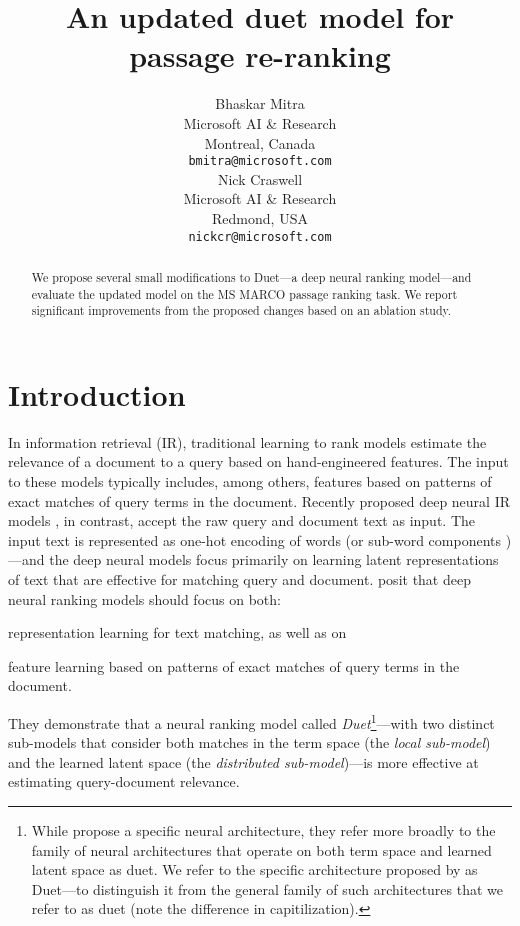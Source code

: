 \documentclass{article}
\title{An updated duet model for passage re-ranking}
\author{
  Bhaskar Mitra \\
  Microsoft AI \& Research \\
  Montreal, Canada \\
  \texttt{bmitra@microsoft.com} \\
   \And
 Nick Craswell \\
  Microsoft AI \& Research \\
  Redmond, USA \\
  \texttt{nickcr@microsoft.com} \\
}
\begin{document}
\maketitle

\begin{abstract}
We propose several small modifications to Duet---a deep neural ranking model---and evaluate the updated model on the MS MARCO passage ranking task. We report significant improvements from the proposed changes based on an ablation study.
\end{abstract}



\section{Introduction}
\label{sec:intro}
In information retrieval (IR), traditional learning to rank \citep{Liu:2009} models estimate the relevance of a document to a query based on hand-engineered features.
The input to these models typically includes, among others, features based on patterns of exact matches of query terms in the document.
Recently proposed deep neural IR models \citep{mitra2018introduction}, in contrast, accept the raw query and document text as input.
The input text is represented as one-hot encoding of words (or sub-word components \citep{kim2016character, jozefowicz2016exploring, sennrich2015neural})---and the deep neural models focus primarily on learning latent representations of text that are effective for matching query and document.
\citet{mitra2016learning} posit that deep neural ranking models should focus on both:
\begin{enumerate*}[label=(\roman*)]
    \item representation learning for text matching, as well as on
    \item feature learning based on patterns of exact matches of query terms in the document.
\end{enumerate*}
They demonstrate that a neural ranking model called \emph{Duet}\footnote{
While \citet{mitra2016learning} propose a specific neural architecture, they refer more broadly to the family of neural architectures that operate on both term space and learned latent space as duet.
We refer to the specific architecture proposed by \citet{mitra2016learning} as Duet---to distinguish it from the general family of such architectures that we refer to as duet (note the difference in capitilization).
}---with two distinct sub-models that consider both matches in the term space (the \emph{local sub-model}) and the learned latent space (the \emph{distributed sub-model})---is more effective at estimating query-document relevance.
\end{document}
